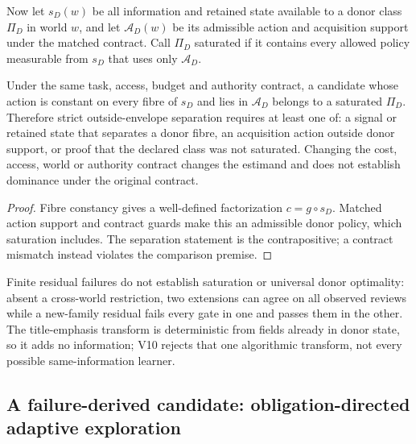 Now let $s_D(w)$ be all information and retained state available to a donor
class $\Pi_D$ in world $w$, and let $\mathcal A_D(w)$ be its admissible action
and acquisition support under the matched contract. Call $\Pi_D$ saturated if
it contains every allowed policy measurable from $s_D$ that uses only
$\mathcal A_D$.

\begin{theorem}
\label{thm:donor-fibre-saturation}
Under the same task, access, budget and authority contract, a candidate whose
action is constant on every fibre of $s_D$ and lies in $\mathcal A_D$ belongs
to a saturated $\Pi_D$. Therefore strict outside-envelope separation requires
at least one of: a signal or retained state that separates a donor fibre, an
acquisition action outside donor support, or proof that the declared class was
not saturated. Changing the cost, access, world or authority contract changes
the estimand and does not establish dominance under the original contract.
\end{theorem}

\begin{proof}
Fibre constancy gives a well-defined factorization $c=g\circ s_D$. Matched
action support and contract guards make this an admissible donor policy, which
saturation includes. The separation statement is the contrapositive; a contract
mismatch instead violates the comparison premise.
\end{proof}

Finite residual failures do not establish saturation or universal donor
optimality: absent a cross-world restriction, two extensions can agree on all
observed reviews while a new-family residual fails every gate in one and passes
them in the other. The title-emphasis transform is deterministic from fields
already in donor state, so it adds no information; V10 rejects that one
algorithmic transform, not every possible same-information learner.

\subsection{A failure-derived candidate: obligation-directed adaptive
exploration}

